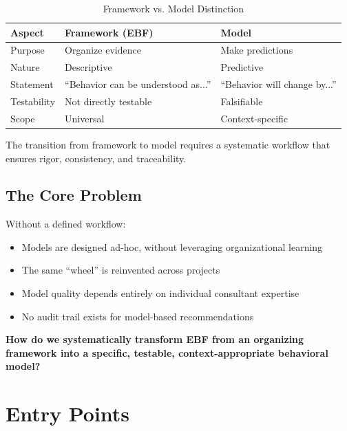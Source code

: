 \begin{table}[htbp]
\centering
\caption{Framework vs. Model Distinction}
\label{tab:eee-framework-model}
\renewcommand{\arraystretch}{1.3}
\begin{tabular}{@{}lll@{}}
\toprule
\textbf{Aspect} & \textbf{Framework (EBF)} & \textbf{Model} \\
\midrule
Purpose & Organize evidence & Make predictions \\
Nature & Descriptive & Predictive \\
Statement & ``Behavior can be understood as...'' & ``Behavior will change by...'' \\
Testability & Not directly testable & Falsifiable \\
Scope & Universal & Context-specific \\
\bottomrule
\end{tabular}
\end{table}

The transition from framework to model requires a systematic workflow that
ensures rigor, consistency, and traceability.

\subsection{The Core Problem}

Without a defined workflow:
\begin{itemize}
\item Models are designed ad-hoc, without leveraging organizational learning
\item The same ``wheel'' is reinvented across projects
\item Model quality depends entirely on individual consultant expertise
\item No audit trail exists for model-based recommendations
\end{itemize}

\begin{tcolorbox}[colback=red!5!white, colframe=red!75!black,
    title=The Fundamental Question]
\textbf{How do we systematically transform EBF from an organizing framework into
a specific, testable, context-appropriate behavioral model?}
\end{tcolorbox}


\section{Entry Points}
\label{sec:eee-entry}

